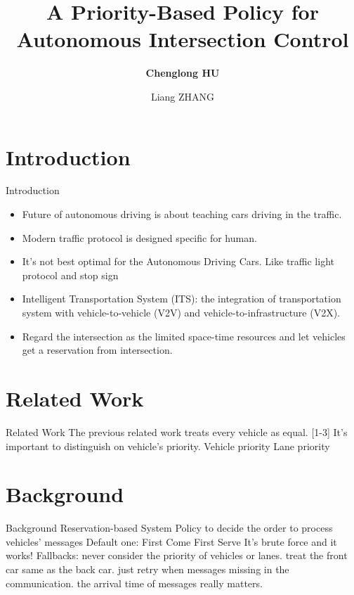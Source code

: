 \documentclass[compress]{beamer}
\title[Priority-based Policy]{A Priority-Based Policy for \\Autonomous Intersection Control}
\author[Chenglong Hu]{\textbf{Chenglong HU} \and Liang ZHANG}
\institute[Fudan University]{
    School of Computer Science \\
    Fudan University, Shanghai \\
    200433, China
}
\begin{document}
  \begin{frame}
  \titlepage
  \end{frame}
  
\section{Introduction}
  \begin{frame}{Introduction}
    \begin{itemize}
        \item Future of autonomous driving is about teaching cars driving in the traffic.
        \item Modern traffic protocol is designed specific for human.
        \item It’s not best optimal for the Autonomous Driving Cars. Like traffic light protocol and stop sign
        \item Intelligent Transportation System (ITS): the integration of transportation system with vehicle-to-vehicle (V2V) and vehicle-to-infrastructure (V2X).
        \item Regard the intersection as the limited space-time resources and let vehicles get a reservation from intersection.
    \end{itemize}
  \end{frame}
  
\section{Related Work}
  \begin{frame}{Related Work}
    The previous related work treats every vehicle as equal. [1-3]
    It’s important to distinguish on vehicle’s priority.
    Vehicle priority
    Lane priority

  \end{frame}
  
\section{Background}
  \begin{frame}{Background}
    Reservation-based System
    Policy to decide the order to process vehicles’ messages
    Default one: First Come First Serve
    It’s brute force and it works!
    Fallbacks:
    never consider the priority of vehicles or lanes.
    treat the front car same as the back car.
    just retry when messages missing in the communication.
    the arrival time of messages really matters.
  \end{frame}
\end{document}
